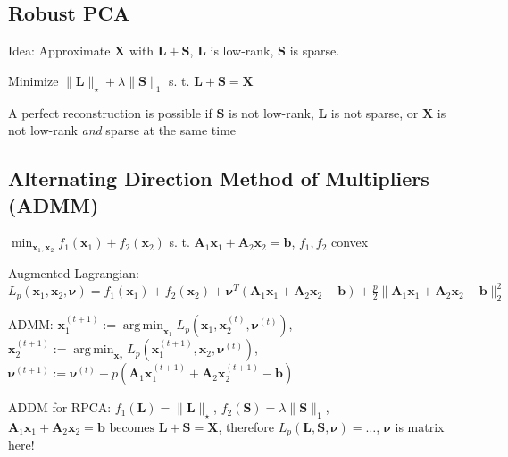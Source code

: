 \documentclass[a4paper, 11pt, landscape]{article}
\DeclareMathOperator*{\argmin}{arg\,min}
\begin{document}
\begin{multicols*}{3}
\section{Robust PCA}
\begin{compactitem}
	\item Idea: Approximate $\mathbf{X}$ with $\mathbf{L} + \mathbf{S}$, $\mathbf{L}$ is low-rank, $\mathbf{S}$ is sparse.
	\item Minimize $\|\mathbf{L}\|_\star + \lambda \|\mathbf{S}\|_1$ s. t. $\mathbf{L} + \mathbf{S} = \mathbf{X}$
	\item A perfect reconstruction is possible if $\mathbf{S}$ is not low-rank, $\mathbf{L}$ is not sparse, or $\mathbf{X}$ is not low-rank \textit{and} sparse at the same time
\end{compactitem}

\subsection{Alternating Direction Method of Multipliers (ADMM)}
$\min_{\mathbf{x}_1, \mathbf{x}_2} f_1(\mathbf{x}_1) + f_2(\mathbf{x}_2)$ s. t. $\mathbf{A}_1 \mathbf{x}_1 + \mathbf{A}_2 \mathbf{x}_2 = \mathbf{b}$, $f_1, f_2$ convex
\begin{inparaitem}[\color{red}\textbullet]
	\item Augmented Lagrangian: $L_p(\mathbf{x}_1, \mathbf{x}_2, \boldsymbol{\nu}) = f_1(\mathbf{x}_1) + f_2(\mathbf{x}_2) + \boldsymbol{\nu}^T (\mathbf{A}_1 \mathbf{x}_1 + \mathbf{A}_2 \mathbf{x}_2 - \mathbf{b}) + \frac{p}{2}\| \mathbf{A}_1 \mathbf{x}_1 + \mathbf{A}_2 \mathbf{x}_2 - \mathbf{b} \|_2^2$
	\item ADMM: $\mathbf{x}_1^{(t+1)} := \argmin_{\mathbf{x}_1} L_p(\mathbf{x}_1, \mathbf{x}_2^{(t)}, \boldsymbol{\nu}^{(t)})$, $\mathbf{x}_2^{(t+1)} := \argmin_{\mathbf{x}_2} L_p(\mathbf{x}_1^{(t+1)}, \mathbf{x}_2, \boldsymbol{\nu}^{(t)})$, $\boldsymbol{\nu}^{(t+1)} := \boldsymbol{\nu}^{(t)} + p(\mathbf{A}_1 \mathbf{x}_1^{(t+1)} + \mathbf{A}_2 \mathbf{x}_2^{(t+1)} - \mathbf{b})$
	\item ADDM for RPCA: $f_1(\mathbf{L}) = \|\mathbf{L}\|_\star$, $f_2(\mathbf{S}) = \lambda \| \mathbf{S} \|_1$, $\mathbf{A}_1 \mathbf{x}_1 + \mathbf{A}_2 \mathbf{x}_2 = \mathbf{b} \text{ becomes } \mathbf{L} + \mathbf{S} = \mathbf{X}$, therefore $L_p(\mathbf{L}, \mathbf{S}, \boldsymbol{\nu}) = \ldots$, $\boldsymbol{\nu}$ is matrix here!
\end{inparaitem}




\end{multicols*}
\end{document}
